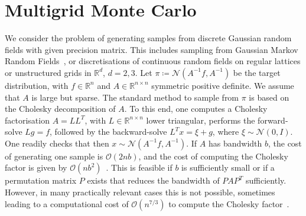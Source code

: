 \documentclass[
fontsize=11pt,
paper=a4,
numbers=noenddot
]{scrartcl}
\begin{document}
\section{Multigrid Monte Carlo}
We consider the problem of generating samples from discrete Gaussian random fields with given precision matrix. This includes sampling from Gaussian Markov Random Fields~\cite{rue2005gaussian}, or discretisations of continuous random fields on regular lattices or unstructured grids in $\mathbb{R}^d$, $d=2,3$. Let $\pi\coloneqq\mathcal{N}(A^{-1}f, A^{-1})$ be the target distribution, with $f \in \mathbb{R}^n$ and $A \in \mathbb{R}^{n \times n}$ symmetric positive definite. We assume that $A$ is large but sparse.
The standard method to sample from $\pi$ is based on the Cholesky decomposition of $A$. To this end, one computes a Cholesky factorisation $A = LL^T$, with $L \in \mathbb{R}^{n \times n}$ lower triangular, performs the forward-solve $L g = f$, followed by the backward-solve $L^T x = \xi + g$, where $\xi \sim \mathcal{N}(0,I)$. One readily checks that then $x \sim \mathcal{N}(A^{-1}f, A^{-1})$. If $A$ has bandwidth $b$, the cost of generating one sample
is $\mathcal{O}(2nb)$, and the cost of computing the Cholesky factor is given by $\mathcal{O}(nb^2)$~\cite{golubvanloan}. This is feasible if $b$ is sufficiently small or if a permutation matrix $P$ exists that reduces the bandwidth of $PAP^T$ sufficiently. However, in many practically relevant cases this is not possible, sometimes leading to a computational cost of $\mathcal{O}(n^{7/3})$ to compute the Cholesky factor~\cite{foxparker}.

\end{document}
